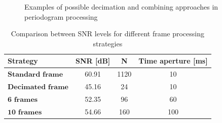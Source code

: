 \begin{figure}[H]
        \hfill
        
        \caption{Examples of possible decimation and combining approaches in periodogram processing}
        \label{fig:allperiodogram-decimation}
    \end{figure}


    
\begin{table}[H]
    \centering 
    \begin{tabular}{|p{9em} c c c |}
    \hline
    \rowcolor{bluepoli!40} %
     \textbf{Strategy} & \textbf{SNR [dB]} & \textbf{N} & \textbf{Time aperture [ms]} \T\B \\
    \hline \hline
    $\textbf{Standard frame}$ & 60.91 & 1120 & 10 \T\B \\
    $\textbf{Decimated frame}$ & 45.16 & 24 & 10 \T\B\\
    $\textbf{6 frames}$ & 52.35 & 96 & 60  \T\B\\
    $\textbf{10 frames}$ & 54.66 & 160 & 100  \T\B\\

    \hline
    \end{tabular}
    \\[10pt]
    \caption{Comparison between SNR levels for different frame processing strategies}
    \label{table:TDDstratcomparison}
\end{table}

